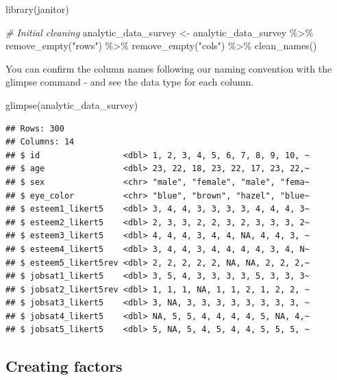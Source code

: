 \documentclass[
]{krantz}
\makeatletter
\newenvironment{Shaded}{\begin{snugshade}}{\end{snugshade}}
\newcommand{\CommentTok}[1]{\textcolor[rgb]{0.37,0.37,0.37}{\textit{#1}}}
\newcommand{\FunctionTok}[1]{\textcolor[rgb]{0,0,0}{#1}}
\newcommand{\NormalTok}[1]{#1}
\newcommand{\OtherTok}[1]{\textcolor[rgb]{0.37,0.37,0.37}{#1}}
\newcommand{\SpecialCharTok}[1]{\textcolor[rgb]{0,0,0}{#1}}
\newcommand{\StringTok}[1]{\textcolor[rgb]{0.5,0.5,0.5}{#1}}
\newenvironment{kframe}{%
\medskip{}
\setlength{\fboxsep}{.8em}
 \def\at@end@of@kframe{}%
 \ifinner\ifhmode%
  \def\at@end@of@kframe{\end{minipage}}%
  \begin{minipage}{\columnwidth}%
 \fi\fi%
 \def\FrameCommand##1{\hskip\@totalleftmargin \hskip-\fboxsep
 \colorbox{shadecolor}{##1}\hskip-\fboxsep
     \hskip-\linewidth \hskip-\@totalleftmargin \hskip\columnwidth}%
 \MakeFramed {\advance\hsize-\width
   \@totalleftmargin\z@ \linewidth\hsize
   \@setminipage}}%
 {\par\unskip\endMakeFramed%
 \at@end@of@kframe}
\renewenvironment{Shaded}{\begin{kframe}}{\end{kframe}}
\makeatother
\begin{document}
\begin{Shaded}
\begin{Highlighting}[]
\FunctionTok{library}\NormalTok{(janitor)}

\CommentTok{\# Initial cleaning}
\NormalTok{analytic\_data\_survey }\OtherTok{\textless{}{-}}\NormalTok{ analytic\_data\_survey }\SpecialCharTok{\%\textgreater{}\%}
  \FunctionTok{remove\_empty}\NormalTok{(}\StringTok{"rows"}\NormalTok{) }\SpecialCharTok{\%\textgreater{}\%}
  \FunctionTok{remove\_empty}\NormalTok{(}\StringTok{"cols"}\NormalTok{) }\SpecialCharTok{\%\textgreater{}\%}
  \FunctionTok{clean\_names}\NormalTok{()}
\end{Highlighting}
\end{Shaded}

You can confirm the column names following our naming convention with the glimpse command - and see the data type for each column.

\begin{Shaded}
\begin{Highlighting}[]
\FunctionTok{glimpse}\NormalTok{(analytic\_data\_survey)}
\end{Highlighting}
\end{Shaded}

\begin{verbatim}
## Rows: 300
## Columns: 14
## $ id                 <dbl> 1, 2, 3, 4, 5, 6, 7, 8, 9, 10, ~
## $ age                <dbl> 23, 22, 18, 23, 22, 17, 23, 22,~
## $ sex                <chr> "male", "female", "male", "fema~
## $ eye_color          <chr> "blue", "brown", "hazel", "blue~
## $ esteem1_likert5    <dbl> 3, 4, 4, 3, 3, 3, 3, 4, 4, 4, 3~
## $ esteem2_likert5    <dbl> 2, 3, 3, 2, 2, 3, 2, 3, 3, 3, 2~
## $ esteem3_likert5    <dbl> 4, 4, 4, 3, 4, 4, NA, 4, 4, 3, ~
## $ esteem4_likert5    <dbl> 3, 4, 4, 3, 4, 4, 4, 4, 3, 4, N~
## $ esteem5_likert5rev <dbl> 2, 2, 2, 2, 2, NA, NA, 2, 2, 2,~
## $ jobsat1_likert5    <dbl> 3, 5, 4, 3, 3, 3, 3, 5, 3, 3, 3~
## $ jobsat2_likert5rev <dbl> 1, 1, 1, NA, 1, 1, 2, 1, 2, 2, ~
## $ jobsat3_likert5    <dbl> 3, NA, 3, 3, 3, 3, 3, 3, 3, 3, ~
## $ jobsat4_likert5    <dbl> NA, 5, 5, 4, 4, 4, 4, 5, NA, 4,~
## $ jobsat5_likert5    <dbl> 5, NA, 5, 4, 5, 4, 4, 5, 5, 5, ~
\end{verbatim}

\hypertarget{creating-factors-5}{%
\subsection{Creating factors}\label{creating-factors-5}}
\end{document}
